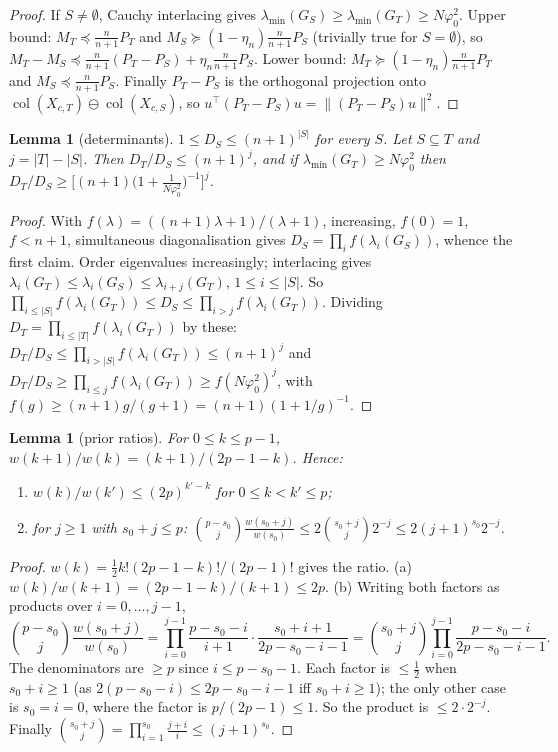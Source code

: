 \documentclass[11pt]{article}
\newtheorem{lemma}[theorem]{Lemma}
\theoremstyle{definition}
\newcommand{\1}{\mathbf 1}
\newcommand{\vp}{\varphi_0^2}
\newcommand{\tr}{^{\top}}
\begin{document}
\begin{proof}
If $S\ne\emptyset$, Cauchy interlacing gives $\lambda_{\min}(G_S)\ge\lambda_{\min}(G_T)\ge N\vp$. Upper bound: $M_T\preceq\frac n{n+1}P_T$ and $M_S\succeq(1-\eta_n)\frac n{n+1}P_S$ (trivially true for $S=\emptyset$), so $M_T-M_S\preceq\frac n{n+1}(P_T-P_S)+\eta_n\frac n{n+1}P_S$. Lower bound: $M_T\succeq(1-\eta_n)\frac n{n+1}P_T$ and $M_S\preceq\frac n{n+1}P_S$. Finally $P_T-P_S$ is the orthogonal projection onto $\operatorname{col}(X_{c,T})\ominus\operatorname{col}(X_{c,S})$, so $u\tr(P_T-P_S)u=\|(P_T-P_S)u\|^2$.
\end{proof}

\begin{lemma}[determinants]\label{lem:det}
$1\le D_S\le(n+1)^{|S|}$ for every $S$. Let $S\subseteq T$ and $j=|T|-|S|$. Then $D_T/D_S\le(n+1)^j$, and if $\lambda_{\min}(G_T)\ge N\vp$ then $D_T/D_S\ge\big[(n+1)\big(1+\tfrac1{N\vp}\big)^{-1}\big]^j$.
\end{lemma}

\begin{proof}
With $f(\lambda)=((n+1)\lambda+1)/(\lambda+1)$, increasing, $f(0)=1$, $f<n+1$, simultaneous diagonalisation gives $D_S=\prod_{i}f(\lambda_i(G_S))$, whence the first claim. Order eigenvalues increasingly; interlacing gives $\lambda_i(G_T)\le\lambda_i(G_S)\le\lambda_{i+j}(G_T)$, $1\le i\le|S|$. So $\prod_{i\le|S|}f(\lambda_i(G_T))\le D_S\le\prod_{i>j}f(\lambda_i(G_T))$. Dividing $D_T=\prod_{i\le|T|}f(\lambda_i(G_T))$ by these: $D_T/D_S\le\prod_{i>|S|}f(\lambda_i(G_T))\le(n+1)^j$ and $D_T/D_S\ge\prod_{i\le j}f(\lambda_i(G_T))\ge f(N\vp)^j$, with $f(g)\ge(n+1)g/(g+1)=(n+1)(1+1/g)^{-1}$.
\end{proof}

\begin{lemma}[prior ratios]\label{lem:prior}
For $0\le k\le p-1$, $w(k+1)/w(k)=(k+1)/(2p-1-k)$. Hence:
\begin{enumerate}
\item[(a)] $w(k)/w(k')\le(2p)^{k'-k}$ for $0\le k<k'\le p$;
\item[(b)] for $j\ge1$ with $s_0+j\le p$: $\binom{p-s_0}{j}\frac{w(s_0+j)}{w(s_0)}\le2\binom{s_0+j}{j}2^{-j}\le2(j+1)^{s_0}2^{-j}$.
\end{enumerate}
\end{lemma}

\begin{proof}
$w(k)=\frac12k!(2p-1-k)!/(2p-1)!$ gives the ratio. (a) $w(k)/w(k+1)=(2p-1-k)/(k+1)\le2p$. (b) Writing both factors as products over $i=0,\dots,j-1$,
\[
\binom{p-s_0}{j}\frac{w(s_0+j)}{w(s_0)}=\prod_{i=0}^{j-1}\frac{p-s_0-i}{i+1}\cdot\frac{s_0+i+1}{2p-s_0-i-1}=\binom{s_0+j}{j}\prod_{i=0}^{j-1}\frac{p-s_0-i}{2p-s_0-i-1}.
\]
The denominators are $\ge p$ since $i\le p-s_0-1$. Each factor is $\le\frac12$ when $s_0+i\ge1$ (as $2(p-s_0-i)\le2p-s_0-i-1$ iff $s_0+i\ge1$); the only other case is $s_0=i=0$, where the factor is $p/(2p-1)\le1$. So the product is $\le2\cdot2^{-j}$. Finally $\binom{s_0+j}{j}=\prod_{i=1}^{s_0}\frac{j+i}{i}\le(j+1)^{s_0}$.
\end{proof}
\end{document}
